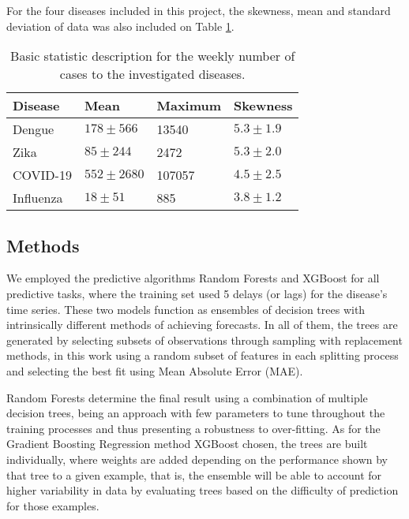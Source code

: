 For the four diseases included in this project, the skewness, mean and standard deviation of data was also included on Table \ref{tab:table_stats}.

\begin{table}[h]
	\caption{\label{tab:table_stats}		Basic statistic description for the weekly number of cases to the investigated diseases.
	}
	\begin{tabular}{llll}
     \centering
		\textrm{Disease}&
		\textrm{Mean}&
		\textrm{Maximum}&
        \textrm{Skewness}\\
		\hline
		Dengue & $178 \pm 566$  & 13540 & $5.3 \pm 1.9$  \rule{0pt}{2.6ex}\\
		\hline
        Zika & $85 \pm 244$  & 2472 & $5.3 \pm 2.0$  \rule{0pt}{2.6ex}\\
		\hline
		COVID-19 & $552 \pm 2680$  & 107057 & $4.5 \pm 2.5$  \rule{0pt}{2.6ex}\\
        \hline
        Influenza & $18 \pm 51$  & 885 & $3.8 \pm 1.2$  \rule{0pt}{2.6ex}\\
	\end{tabular}
\end{table}

\subsection{\label{sec:model} Methods}
We employed the predictive algorithms Random Forests and XGBoost for all predictive tasks, where the training set used 5 delays (or lags) for the disease's time series. These two models function as ensembles of decision trees with intrinsically different methods of achieving forecasts. In all of them, the trees are generated by selecting subsets of observations through sampling with replacement methods, in this work using a random subset of features in each splitting process and selecting the best fit using Mean Absolute Error (MAE).

Random Forests \cite{Breiman2001Oct} determine the final result using a combination of multiple decision trees, being an approach with few parameters to tune throughout the training processes and thus presenting a robustness to over-fitting. 
As for the Gradient Boosting Regression method XGBoost \cite{Chen2016Aug} chosen, the trees are built individually, where weights are added depending on the performance shown by that tree to a given example, that is, the ensemble will be able to account for higher variability in data by evaluating trees based on the difficulty of prediction for those examples.

